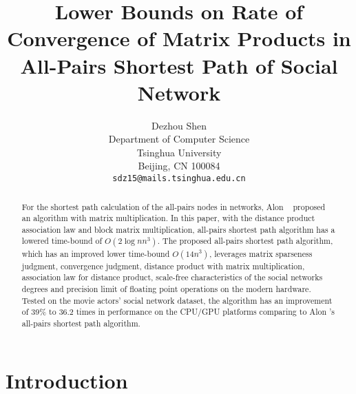 \documentclass[review]{cvpr}
\begin{document}
\title{Lower Bounds on Rate of Convergence of Matrix Products in All-Pairs Shortest Path of Social Network}

\author{Dezhou Shen\\
Department of Computer Science\\
Tsinghua University\\
Beijing, CN 100084\\
{\tt\small sdz15@mails.tsinghua.edu.cn}
}

\maketitle


\begin{abstract}
  For the shortest path calculation of the all-pairs nodes in networks, Alon \etal~\cite{alon1997exponent} proposed an algorithm with matrix multiplication.
  In this paper, with the distance product association law and block matrix multiplication, all-pairs shortest path algorithm has a lowered time-bound of \(O(2\log{n}n^3)\).
  The proposed all-pairs shortest path algorithm, which has an improved lower time-bound \(O(14n^3)\), leverages matrix sparseness judgment, convergence judgment, distance product with matrix multiplication, association law for distance product,
  scale-free characteristics of the social networks degrees and precision limit of floating point operations on the modern hardware.
  Tested on the movie actors' social network dataset, the algorithm has an improvement of 39\% to 36.2 times in performance on the CPU/GPU platforms comparing to Alon \etal's all-pairs shortest path algorithm.
\end{abstract}

\section{Introduction}
\end{document}
